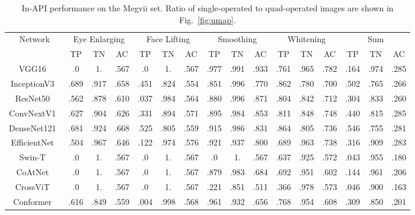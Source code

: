 \documentclass[sigconf]{acmart}
\begin{document}
\begin{table}
\begin{center}
   \caption{In-API performance on the Megvii set. Ratio of single-operated to quad-operated images are shown in Fig.~\ref{fig:umap}.}
   \label{table:full_experiment_megvii}
\begin{tabular}{c|ccc|ccc|ccc|ccc|ccc}
\hline 
\multirow{2}{*}{Network}&\multicolumn{3}{c}{Eye Enlarging} &\multicolumn{3}{c}{Face Lifting}&\multicolumn{3}{c}{Smoothing} &\multicolumn{3}{c}{Whitening} &\multicolumn{3}{c}{Sum}\\\
& TP & TN & AC & TP & TN & AC & TP & TN & AC & TP & TN & AC & TP & TN & AC
\\
\hline  \hline
VGG16~\cite{VGG}&.0 & 1. & .567 & .0 & 1. & .567 & .977 & .991 & .933 & .761 & .965 & .782 & .164 & .974 & .285\\
InceptionV3~\cite{inceptionv2} &.689 &.917 &.658 &.451 &.824 &.554 &.851 &.996 &.770 &.862 &.780 &.700 &.502 &.765 &.266\\
ResNet50~\cite{ResNetv2} &.562 &.878 &.610 &.037 &.984 &.564 &.880 &.996 &.871 &.804 &.842 &.712 &.304 &.833 &.260\\
ConvNextV1~\cite{ConvNext} &.627 &.904 &.626 &.331 &.894 &.571 &.895 &.984 &.853 &.811 &.848 &.748 &.440 &.815 &.285\\
DenseNet121~\cite{DenseNet} &.681 &.924 &.668 &.525 &.805 &.559 &.915 &.986 &.831&.864&.805&.736&.546&.755&.281\\
EfficientNet~\cite{tan2019efficientnet} &.504 &.967 &.646 &.122 &.974 &.576 &.921 &.937 &.800 &.689 &.963 &.738 &.316 &.909 &.283\\
\hline 
\hline
Swin-T~\cite{Swin} &.0&1.&.567&.0&1.&.567&.0&1.&.567&.637&.925&.572&.043&.955&.180\\
CoAtNet~\cite{dai2021coatnet} &.0&1.&.567&.0&1.&.567&.879&.983&.684&.692&.951&.602&.144&.961&.206\\
CrossViT~\cite{chen2021crossvit}&.0&1.&.567&.0&1.&.567&.221&.851&.511&.366&.978&.573&.046&.900&.163\\
Conformer~\cite{conformer} &.616 &.849 &.559 &.004 &.998 &.568 &.961 &.932 &.656 &.768 &.954 &.608 &.309 &.850 &.201\\
\hline 
\hline

\end{tabular}
\end{center}
\end{table}
\end{document}
